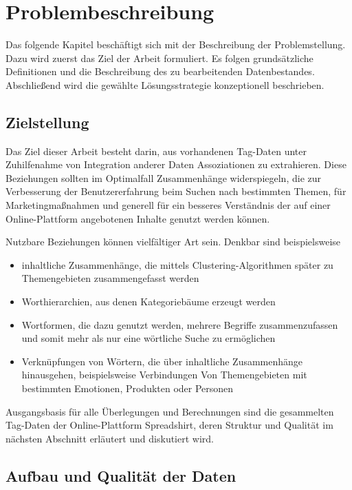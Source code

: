 \chapter{Problembeschreibung}

Das folgende Kapitel beschäftigt sich mit der Beschreibung der Problemstellung. Dazu wird zuerst das Ziel der Arbeit formuliert. Es folgen grundsätzliche Definitionen und die Beschreibung des zu bearbeitenden Datenbestandes. Abschließend wird die gewählte Lösungsstrategie konzeptionell beschrieben.

\section{Zielstellung}

Das Ziel dieser Arbeit besteht darin, aus vorhandenen Tag-Daten unter Zuhilfenahme von Integration anderer Daten Assoziationen zu extrahieren. Diese Beziehungen sollten im Optimalfall Zusammenhänge widerspiegeln, die zur Verbesserung der Benutzererfahrung beim Suchen nach bestimmten Themen, für Marketingmaßnahmen und generell für ein besseres Verständnis der auf einer Online-Plattform angebotenen Inhalte genutzt werden können.

Nutzbare Beziehungen können vielfältiger Art sein. Denkbar sind beispielsweise

\begin{itemize}
    \item inhaltliche Zusammenhänge, die mittels Clustering-Algorithmen später zu Themengebieten zusammengefasst werden
    \item Worthierarchien, aus denen Kategoriebäume erzeugt werden
    \item Wortformen, die dazu genutzt werden, mehrere Begriffe zusammenzufassen und somit mehr als nur eine wörtliche Suche zu ermöglichen
    \item Verknüpfungen von Wörtern, die über inhaltliche Zusammenhänge hinausgehen, beispielsweise Verbindungen Von Themengebieten mit bestimmten Emotionen, Produkten oder Personen
\end{itemize}

Ausgangsbasis für alle Überlegungen und Berechnungen sind die gesammelten Tag-Daten der Online-Plattform Spreadshirt, deren Struktur und Qualität im nächsten Abschnitt erläutert und diskutiert wird.

\section{Aufbau und Qualität der Daten}
\label{data}


